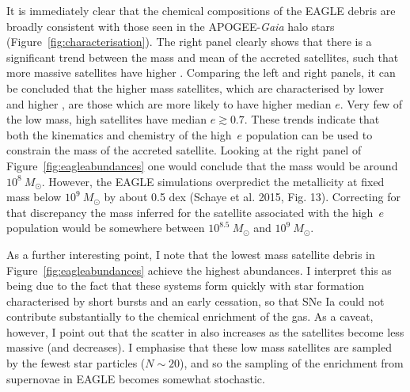 It is immediately clear that the chemical compositions of the EAGLE debris
are broadly consistent with those seen in the APOGEE-\emph{Gaia}
halo stars (Figure~\ref{fig:characterisation}).  The right panel
clearly shows that there is a significant trend between the mass
and mean \feh{} of the accreted satellites, such that more massive
satellites have higher \feh{}.  Comparing the left and right panels,
it can be concluded that the higher mass satellites, which are characterised
by lower \mgfe{} and higher \feh{}, are those which are more likely
to have higher median $e$.  Very few of the low mass, high \mgfe{}
satellites have median $e \gtrsim 0.7$.  These trends indicate that both the kinematics and chemistry of the high~$e$
population can be used to constrain the mass of the accreted satellite.  Looking at the
right panel of Figure~\ref{fig:eagleabundances} one would conclude that the
mass would be around $10^8~M_\odot$.  However, the EAGLE simulations
overpredict the metallicity at fixed mass below $10^9~M_\odot$ by about 0.5
dex (Schaye et al. 2015, Fig. 13).  Correcting for that discrepancy the
mass inferred for the satellite associated with the high~$e$ population
would be somewhere between $10^{8.5}~M_\odot$ and $10^9~M_\odot$.

As a further interesting point, I note that the lowest mass satellite
debris in Figure~\ref{fig:eagleabundances} achieve the highest
\mgfe{} abundances.  I interpret this as being due to the
fact that these systems form quickly with star formation characterised
by short bursts and an early cessation, so that SNe Ia could not
contribute substantially to the chemical enrichment of the gas.  As a
caveat, however, I point out that the scatter in \mgfe{} also
increases as the satellites become less massive (and \feh{} decreases).
I emphasise that these low mass satellites are sampled by the
fewest star particles ($N\sim 20$), and so the sampling of the
enrichment from supernovae in EAGLE becomes somewhat stochastic.



